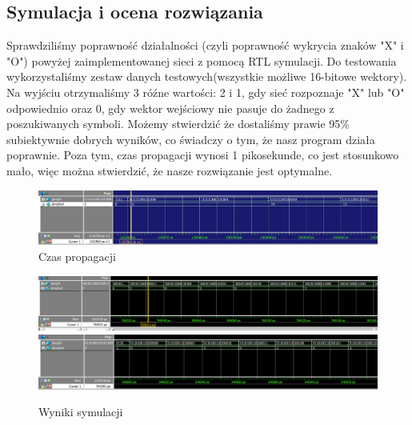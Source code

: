 \documentclass[a4paper, titleauthor]{mwart}
\begin{document}
\subsection{Symulacja i ocena rozwiązania}
Sprawdziliśmy poprawność działalności (czyli poprawność wykrycia znaków "X" i "O") powyżej zaimplementowanej sieci z pomocą RTL symulacji. Do testowania wykorzystaliśmy zestaw danych testowych(wszystkie możliwe 16-bitowe wektory). Na wyjściu otrzymaliśmy 3 róźne wartości: 2 i 1, gdy sieć rozpoznaje "X" lub "O" odpowiednio oraz 0, gdy wektor wejściowy nie pasuje do żadnego z poszukiwanych symboli.
Możemy stwierdzić że dostaliśmy prawie 95\% subiektywnie dobrych wyników, co świadczy o tym, że nasz program działa poprawnie. 
Poza tym, czas propagacji wynosi 1 pikosekunde, co jest stosunkowo mało, więc można stwierdzić, że nasze rozwiązanie jest optymalne.
\newpage
\begin{figure}[h]
    \centering
    \includegraphics[width = \textwidth]{czas_propagacji.png}
    \caption{Czas propagacji}
    \label{fig:my_label}
\end{figure}
\begin{figure}[h]
    \centering
    \includegraphics[width = \textwidth]{sym1.png}
    \includegraphics[width = \textwidth]{sym2.png}
    \caption{Wyniki symulacji}
    \label{fig:my_label}
\end{figure}
\end{document}
